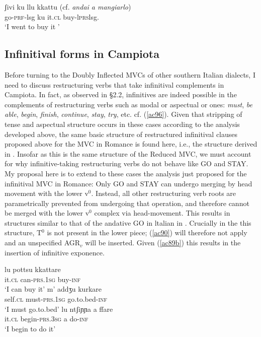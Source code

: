 \documentclass[output=paper]{langscibook}
\begin{document}
\ea \label{ac95} \gll  ʃivi  ku  llu kkattu (cf. \textit{andai a mangiarlo})\\
  go-\textsc{prf}-lsg  ku  it.\textsc{cl} buy-l\textsc{prs}lsg. \\
 \glt ‘I went to buy it '
\z

\subsection{Infinitival forms in Campiota}

Before turning to the Doubly Inflected MVCs of other southern Italian dialects, I need to discuss restructuring verbs that take infinitival complements in Campiota. In fact, as observed in §2.2, infinitives are indeed possible in the complements of restructuring verbs such as modal or aspectual or ones: \textit{must},\textit{ be  able},  \textit{begin},  \textit{finish},  \textit{continue},  \textit{stay},  \textit{try}, etc. cf. (\ref{ac96}). Given that stripping of tense and aspectual structure occurs in these cases according to the analysis developed above, the same basic structure of restructured infinitival clauses proposed above for the MVC in Romance is found here, i.e., the structure derived in . Insofar as this is the same structure of the Reduced MVC, we must account for why infinitive-taking restructuring verbs do not behave like GO and STAY. My proposal here is to extend to these cases the analysis just proposed for the infinitival MVC in Romance: Only GO and STAY can undergo merging  by  head  movement  with  the  lower  v$^0$.  Instead, all other restructuring verb roots are parametrically prevented from undergoing that operation, and therefore cannot be merged with the lower v$^0$ complex via head-movement. This results in structures similar to that of the andative GO in ltalian in . Crucially in the this structure, T$^0$ is not present in the lower piece; (\ref{ac90}) will therefore not apply and an unspecified AGR$_v$ will be inserted.  Given (\ref{ac89b}) this results in the insertion of infinitive exponence.

\ea \label{ac96}
    \ea \gll lu      pottsu     kkattare\\
    it.\textsc{cl} can-\textsc{prs}.\textsc{1sg} buy-\textsc{inf}\\
    \glt `I can buy it'
    \ex \gll m’    addʒu      kurkare\\
    self.\textsc{cl}  must-\textsc{prs}.\textsc{1sg}   go.to.bed-\textsc{inf} \\
    \glt `I must go.to.bed'
    \ex \gll lu ntʃiɲɲa       a  ffare\\
    it.\textsc{cl} begin-\textsc{prs}.\textsc{3sg} a  do-\textsc{inf} \\
    \glt `I begin to do it'
    \z
\z
\end{document}
